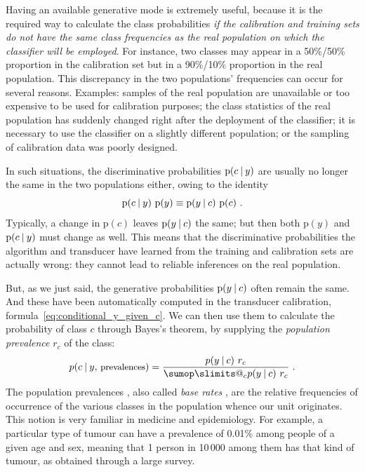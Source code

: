 \documentclass[\ifafour a4paper,12pt,\else a5paper,10pt,\fi%
onecolumn,oneside,article,%
british%
]{memoir}
\makeatletter
\theoremstyle{remark}
\theoremstyle{innote}
\def\sum{\DOTSI\sumop\slimits@}
\newcommand*{\p}{\mathrm{p}}%
\renewcommand*{\|}[1][]{\nonscript\:#1\vert\nonscript\:\mathopen{}}
\newcommand*{\sect}{\S}%
\newcommand*{\chap}{ch.}%
\newcommand*{\texts}[1]{\text{\small #1}}
\newcommand*{\br}{r}
\makeatother
\begin{document}
Having an available generative mode is extremely useful, because it is the required way to calculate the class probabilities \emph{if the calibration and training sets do not have the same class frequencies as the real population on which the classifier will be employed}. For instance, two classes may appear in a 50\%/50\% proportion in the calibration set but in a 90\%/10\% proportion in the real population. This discrepancy in the two populations' frequencies can occur for several reasons. Examples: samples of the real population are unavailable or too expensive to be used for calibration purposes; the class statistics of the real population has suddenly changed right after the deployment of the classifier; it is necessary to use the classifier on a slightly different population; or the sampling of calibration data was poorly designed.

In such situations, the discriminative probabilities $\p(c \| y)$ are usually no longer the same in the two populations either, owing to the identity
\begin{equation}
  \label{eq:identity_conditionals}
  \p(c \| y)\ \p(y) \equiv \p(y \| c)\ \p(c) \ .
\end{equation}
Typically, a change in $\p(c)$ leaves $\p(y \| c)$ the same; but then both $\p(y)$ and $\p(c \| y)$ must change as well. This means that the discriminative probabilities the algorithm and transducer have learned from the training and calibration sets are actually wrong: they cannot lead to reliable inferences on the real population.

But, as we just said, the generative probabilities $\p(y \| c)$ often remain the same. And these have been automatically computed in the transducer calibration, formula~\eqref{eq:conditional_y_given_c}.
We can then use them to calculate the probability of class $c$ through Bayes's theorem, by supplying the \emph{population prevalence} $\br_{c}$ of the class:
\begin{equation}
  \label{eq:bayes_baserate}
  p(c \| y,\, \texts{prevalences}) = \frac{p(y \| c)\ \br_{c}}{ \sum_{c} p(y \| c)\ \br_{c} } \ .
\end{equation}
The population prevalences \autocites[\chap~3]{soxetal1988_r2013}[\sect~5.1]{huninketal2001_r2014}, also called \emph{base rates} \autocites{barhillel1980,axelsson2000}, are the relative frequencies of occurrence of the various classes in the population whence our unit originates. This notion is very familiar in medicine and epidemiology. For example, a particular type of tumour can have a prevalence of 0.01\% among people of a given age and sex, meaning that 1 person in 10\,000 among them has that kind of tumour, as obtained through a large survey.
\end{document}
